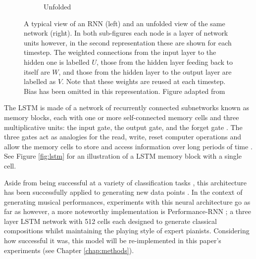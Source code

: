 \documentclass[a4paper]{book}
\begin{document}
\begin{figure}[t]
\begin{subfigure}{.74\linewidth}
        \caption{Unfolded}
        \label{fig:rnn_unfolded}
    \end{subfigure}
    \caption{A typical view of an RNN (left) and an unfolded view of the same network (right). In both sub-figures each node is a layer of network units however, in the second representation these are shown for each timestep. The weighted connections from the input layer to the hidden one is labelled $U$, those from the hidden layer feeding back to itself are $W$, and those from the hidden layer to the output layer are labelled as $V$. Note that these weights are reused at each timestep. Bias has been omitted in this representation. Figure adapted from \textcite{graves_supervised_2012}}
\end{figure}

The LSTM is made of a network of recurrently connected subnetworks known as memory blocks, each with one or more self-connected memory cells and three multiplicative units: the input gate, the output gate, and the forget gate \parencite{hochreiter_long_1997}. The three gates act as analogies for the read, write, reset computer operations and allow the memory cells to store and access information over long periods of time \parencite{graves_supervised_2012}. See Figure \ref{fig:lstm} for an illustration of a LSTM memory block with a single cell.

Aside from being successful at a variety of classification tasks \parencite[e.g.,][]{graves_framewise_2005}, this architecture has been successfully applied to generating new data points \parencite[such as creating sequences of text;][]{graves_generating_2013}. In the context of generating musical performances, experiments with this neural architecture go as far as \textcite{eck_first_2002} however, a more noteworthy implementation is Performance-RNN \parencite{oore_this_2018}; a three layer LSTM network with 512 cells each designed to generate classical compositions whilst maintaining the playing style of expert pianists. Considering how successful it was, this model will be re-implemented in this paper's experiments (see Chapter \ref{chap:methods}).
\end{document}
